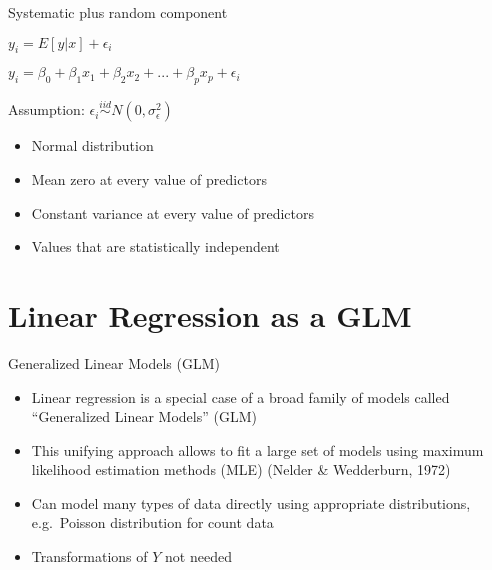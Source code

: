 \documentclass[
  ignorenonframetext,
]{beamer}
\providecommand{\tightlist}{%
  \setlength{\itemsep}{0pt}\setlength{\parskip}{0pt}}
\begin{document}
\begin{frame}{Systematic plus random component}
\protect\hypertarget{systematic-plus-random-component}{}

\(y_i = E[y|x] + \epsilon_i\)

\(y_i = \beta_0 + \beta_1 x_1 + \beta_2 x_2 + ... + \beta_p x_p + \epsilon_i\)

Assumption: \(\epsilon_i \stackrel{iid}{\sim} N(0, \sigma_\epsilon^2)\)

\begin{itemize}
\tightlist
\item
  Normal distribution
\item
  Mean zero at every value of predictors
\item
  Constant variance at every value of predictors
\item
  Values that are statistically independent
\end{itemize}

\end{frame}

\hypertarget{linear-regression-as-a-glm}{%
\section{Linear Regression as a GLM}\label{linear-regression-as-a-glm}}

\begin{frame}{Generalized Linear Models (GLM)}
\protect\hypertarget{generalized-linear-models-glm}{}

\begin{itemize}
\tightlist
\item
  Linear regression is a special case of a broad family of models called
  ``Generalized Linear Models'' (GLM)
\item
  This unifying approach allows to fit a large set of models using
  maximum likelihood estimation methods (MLE) (Nelder \& Wedderburn,
  1972)
\item
  Can model many types of data directly using appropriate distributions,
  e.g.~Poisson distribution for count data
\item
  Transformations of \(Y\) not needed
\end{itemize}

\end{frame}
\end{document}
